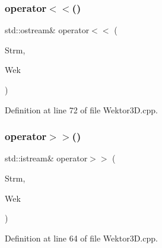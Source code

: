 \subsubsection{\texorpdfstring{operator$<$$<$()}{operator<<()}}
{\footnotesize\ttfamily std\+::ostream\& operator$<$$<$ (\begin{DoxyParamCaption}\item[{std\+::ostream \&}]{Strm,  }\item[{const \hyperlink{_wektor3_d_8hh_ac353a272b38b4ad342f7181ad7bdb91a}{Wektor3D} \&}]{Wek }\end{DoxyParamCaption})}



Definition at line 72 of file Wektor3\+D.\+cpp.

\mbox{\label{_wektor3_d_8hh_a1075392800748e0563d8b2c02640a458}} 
\subsubsection{\texorpdfstring{operator$>$$>$()}{operator>>()}}
{\footnotesize\ttfamily std\+::istream\& operator$>$$>$ (\begin{DoxyParamCaption}\item[{std\+::istream \&}]{Strm,  }\item[{\hyperlink{_wektor3_d_8hh_ac353a272b38b4ad342f7181ad7bdb91a}{Wektor3D} \&}]{Wek }\end{DoxyParamCaption})}



Definition at line 64 of file Wektor3\+D.\+cpp.

